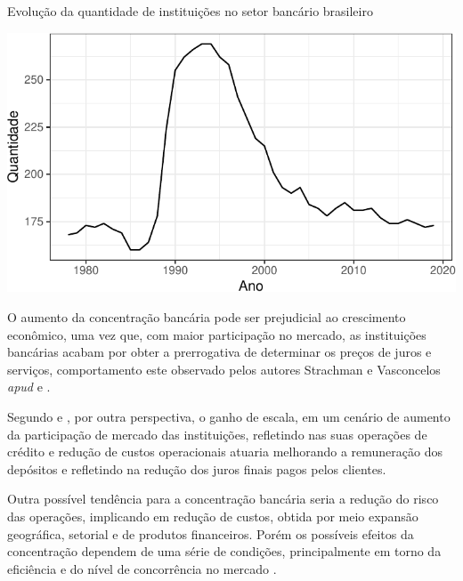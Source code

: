 \documentclass[
  12pt,
  12pt,
  openright,
  oneside,
  a4paper,
  chapter=TITLE,
  section=TITLE,
  subsection=TITLE,
  subsubsection=TITLE,
  english,
  portugues,
  sumario=tradicional]{abntex2}
\begin{document}
\begin{grafico}[!hbtp]
\vspace{20pt}
\caption{Evolução da quantidade de instituições no setor bancário brasileiro}
\vspace{-4mm}

\begin{center}\includegraphics{12-exportedfigures/concetration-1} \end{center}
\vspace{-3mm}
\label{graf:concentracao}
\vspace{-2mm}
\end{grafico}

O aumento da concentração bancária pode ser prejudicial ao crescimento econômico, uma vez que, com maior participação no mercado, as instituições bancárias acabam por obter a prerrogativa de determinar os preços de juros e serviços, comportamento este observado pelos autores Strachman e Vasconcelos \emph{apud} \textcite{camargo:2009} e \textcite{klein:1971}.

Segundo \textcite{camargo:2009} e \textcite{dantas:2012}, por outra perspectiva, o ganho de escala, em um cenário de aumento da participação de mercado das instituições, refletindo nas suas operações de crédito e redução de custos operacionais atuaria melhorando a remuneração dos depósitos e refletindo na redução dos juros finais pagos pelos clientes.

Outra possível tendência para a concentração bancária seria a redução do risco
das operações, implicando em redução de custos, obtida por meio expansão
geográfica, setorial e de produtos financeiros. Porém os possíveis efeitos da
concentração dependem de uma série de condições, principalmente em torno da
eficiência e do nível de concorrência no mercado \cite{camargo:2009}.
\end{document}
